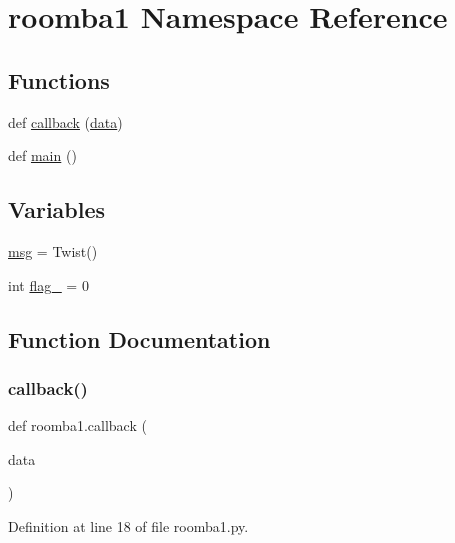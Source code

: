 \hypertarget{namespaceroomba1}{}\section{roomba1 Namespace Reference}
\label{namespaceroomba1}
\subsection*{Functions}
\begin{DoxyCompactItemize}
\item 
def \mbox{\hyperlink{namespaceroomba1_a58c95722ae47f44d032543b83d5a5488}{callback}} (\mbox{\hyperlink{structdata}{data}})
\item 
def \mbox{\hyperlink{namespaceroomba1_a88a93d8d734568e0fd1f30bea9b04418}{main}} ()
\end{DoxyCompactItemize}
\subsection*{Variables}
\begin{DoxyCompactItemize}
\item 
\mbox{\hyperlink{namespaceroomba1_a6a8c8de93f17ada422622a6b13819af3}{msg}} = Twist()
\item 
int \mbox{\hyperlink{namespaceroomba1_a00837fdf66874d8273b272d12c3a93b4}{flag\+\_}} = 0
\end{DoxyCompactItemize}


\subsection{Function Documentation}
\mbox{\label{namespaceroomba1_a58c95722ae47f44d032543b83d5a5488}} 
\subsubsection{\texorpdfstring{callback()}{callback()}}
{\footnotesize\ttfamily def roomba1.\+callback (\begin{DoxyParamCaption}\item[{}]{data }\end{DoxyParamCaption})}



Definition at line 18 of file roomba1.\+py.

\mbox{\label{namespaceroomba1_a88a93d8d734568e0fd1f30bea9b04418}} 
